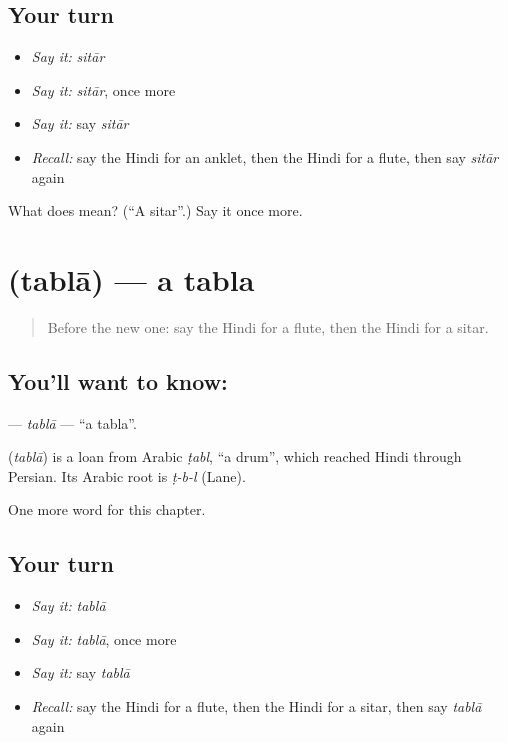 \subsection*{Your turn}
\begin{itemize}
\raggedright
  \item \emph{Say it:} \emph{sitār}
  \item \emph{Say it:} \emph{sitār}, once more
  \item \emph{Say it:} say \emph{sitār}
  \item \emph{Recall:} say the Hindi for an anklet, then the Hindi for a flute, then say \emph{sitār} again
\end{itemize}

\begin{tcolorbox}[breakable,colback=teal!4,colframe=teal!35!black,title={Before you move on}]
What does  mean? (\textquotedblleft{}A sitar\textquotedblright{}.) Say it once more.
\end{tcolorbox}
\section[\texorpdfstring{\hi{तबला} (tablā)}{तबला (tablā)}]{ (tablā) — a tabla}

\label{lesson:HI-C264-tabla}



\begin{quote}
Before the new one: say the Hindi for a flute, then the Hindi for a sitar.
\end{quote}

\subsection*{You'll want to know: }
\textbf{} — \emph{tablā} — \textquotedblleft{}a tabla\textquotedblright{}.

\begin{cousinweb}
\textbf{} (\emph{tablā}) is a loan from Arabic \emph{ṭabl}, \textquotedblleft{}a drum\textquotedblright{}, which reached Hindi through Persian. Its Arabic root is \emph{ṭ-b-l} (Lane).
\end{cousinweb}

\begin{grammarlens}[title={What you've built}]
One more word for this chapter.
\end{grammarlens}

\subsection*{Your turn}
\begin{itemize}
\raggedright
  \item \emph{Say it:} \emph{tablā}
  \item \emph{Say it:} \emph{tablā}, once more
  \item \emph{Say it:} say \emph{tablā}
  \item \emph{Recall:} say the Hindi for a flute, then the Hindi for a sitar, then say \emph{tablā} again
\end{itemize}

